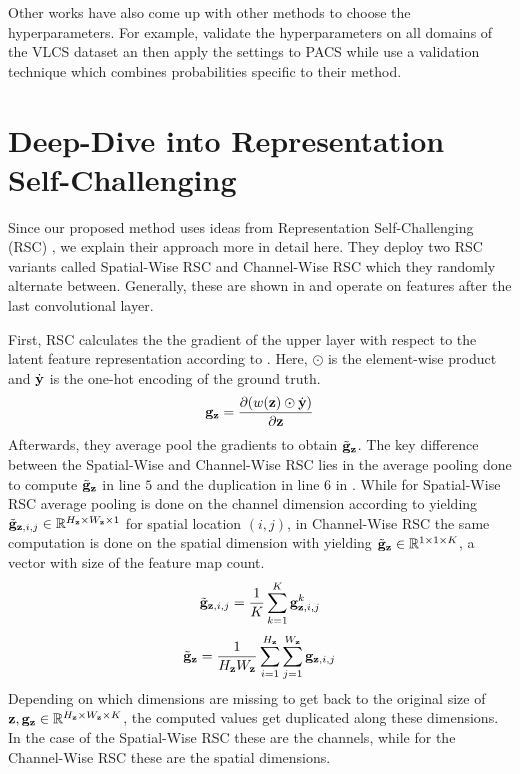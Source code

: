 Other works have also come up with other methods to choose the hyperparameters. For example, \citet{krueger2020outofdistribution} validate the hyperparameters on all domains of the VLCS dataset an then apply the settings to PACS while \citet{DInnocenteC18} use a validation technique which  combines probabilities specific to their method. 

\section{Deep-Dive into Representation Self-Challenging}
\label{sec:RSC}
Since our proposed method uses ideas from Representation Self-Challenging (RSC) \citep{huang2020selfchallenging}, we explain their approach more in detail here. They deploy two RSC variants called Spatial-Wise RSC and Channel-Wise RSC which they randomly alternate between. Generally, these are shown in  and operate on features after the last convolutional layer. 

First, RSC calculates the the gradient of the upper layer with respect to the latent feature representation according to . Here, $\odot$ is the element-wise product and $\dot{\mathbf{y}}$ is the one-hot encoding of the ground truth.
\begin{equation}
    \mathbf{g}_\mathbf{z} = \frac{\partial( w (\mathbf{z}) \odot \dot{\mathbf{y}})}{\partial \mathbf{z}}
    \label{eq:gz}
\end{equation}
Afterwards, they average pool the gradients to obtain $\Tilde{\mathbf{g}}_\mathbf{z}$. The key difference between the Spatial-Wise and Channel-Wise RSC lies in the average pooling done to compute $\Tilde{\mathbf{g}}_\mathbf{z}$ in line $5$ and the duplication in line $6$ in . While for Spatial-Wise RSC average pooling is done on the channel dimension according to  yielding $\Tilde{\mathbf{g}}_{\mathbf{z}, i, j} \in \mathbb{R}^{H_{\mathbf{z}} \times W_{\mathbf{z}} \times 1}$ for spatial location $(i,j)$, in Channel-Wise RSC the same computation is done on the spatial dimension with  yielding $\Tilde{\mathbf{g}}_\mathbf{z} \in \mathbb{R}^{1 \times 1 \times K}$, a vector with size of the feature map count.
\begin{equation}
\label{eq:SpatialRSCavg}
     \Tilde{\mathbf{g}}_{\mathbf{z}, i, j} = \frac{1}{K} \sum_{k=1}^K \mathbf{g}_{\mathbf{z},i,j}^k
\end{equation}
\begin{equation}
\label{eq:ChannelRSCavg}
     \Tilde{\mathbf{g}}_\mathbf{z} = \frac{1}{H_\mathbf{z}W_\mathbf{z}} \sum_{i=1}^{H_\mathbf{z}} \sum_{j=1}^{W_\mathbf{z}} \mathbf{g}_{\mathbf{z},i,j}
\end{equation}
Depending on which dimensions are missing to get back to the original size of $\mathbf{z}, \mathbf{g}_\mathbf{z} \in \mathbb{R}^{H_\mathbf{z} \times W_\mathbf{z} \times K}$, the computed values get duplicated along these dimensions. In the case of the Spatial-Wise RSC these are the channels, while for the Channel-Wise RSC these are the spatial dimensions. 

